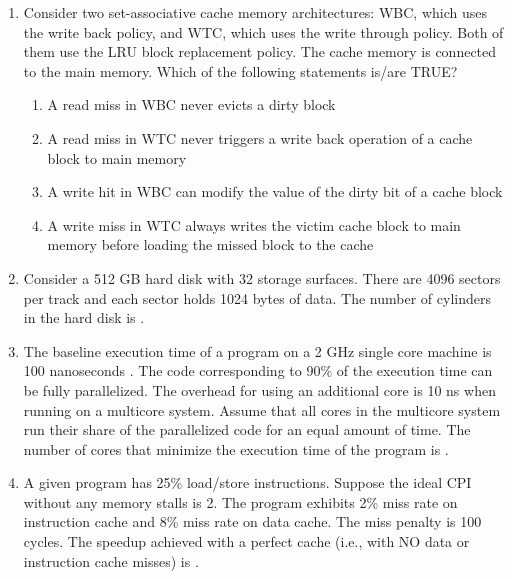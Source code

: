 \documentclass[a4paper, 11pt]{article}
\begin{document}
\begin{enumerate}
    \item Consider two set-associative cache memory architectures: WBC, which uses the write back policy, and WTC, which uses the write through policy. Both of them use the LRU  block replacement policy. The cache memory is connected to the main memory. Which of the following statements is/are TRUE?
    \begin{enumerate}
        \item A read miss in WBC never evicts a dirty block
        \item A read miss in WTC never triggers a write back operation of a cache block to main memory
        \item A write hit in WBC can modify the value of the dirty bit of a cache block
        \item A write miss in WTC always writes the victim cache block to main memory before loading the missed block to the cache
    \end{enumerate}
    \hfill{}

    \item Consider a 512 GB hard disk with 32 storage surfaces. There are 4096 sectors per track and each sector holds 1024 bytes of data. The number of cylinders in the hard disk is \underline{\hspace{2cm}}.
    \item The baseline execution time of a program on a 2 GHz single core machine is 100 nanoseconds . The code corresponding to 90\% of the execution time can be fully parallelized. The overhead for using an additional core is 10 ns when running on a multicore system. Assume that all cores in the multicore system run their share of the parallelized code for an equal amount of time.    
    The number of cores that minimize the execution time of the program is \underline{\hspace{2cm}}.
    \hfill{}

    \item A given program has 25\% load/store instructions. Suppose the ideal CPI  without any memory stalls is 2. The program exhibits 2\% miss rate on instruction cache and 8\% miss rate on data cache. The miss penalty is 100 cycles. The speedup  achieved with a perfect cache (i.e., with NO data or instruction cache misses) is \underline{\hspace{2cm}}.


\end{enumerate}
\end{document}
